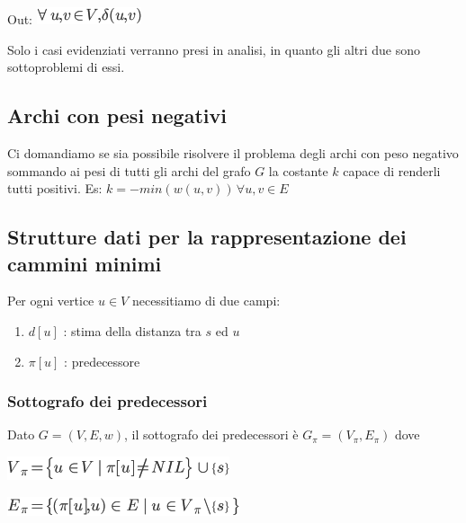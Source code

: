 \documentclass{article}
\providecommand{\tightlist}{%
  \setlength{\itemsep}{0pt}\setlength{\parskip}{0pt}}
\begin{document}
{{{{Out: }\includegraphics{images/image506.png}

{}

{Solo i casi evidenziati verranno presi in analisi, in quanto gli altri
due sono sottoproblemi di essi.}

{}

\subsection{\texorpdfstring{{Archi con pesi negativi}}{Archi con pesi negativi}}\label{h.tf12b72w5l3}

{Ci domandiamo se sia possibile risolvere il problema degli archi con peso negativo sommando ai pesi di tutti gli archi del grafo $G$ la costante $k$ capace di renderli tutti positivi. Es: $k=-min(w(u,v))\,\forall u,v \in E$}

\subsection{\texorpdfstring{{Strutture dati per la rappresentazione dei cammini minimi}}{Strutture dati per la rappresentazione dei cammini minimi}}\label{h.ee7q1txmgnne}

{}

{Per ogni vertice $u \in V$ necessitiamo di due campi:}

\begin{enumerate}
\tightlist
\item
$d[u]$ : stima della distanza tra $s$ ed $u$
\item
$\pi[u]$ : predecessore
\end{enumerate}

\subsubsection{\texorpdfstring{{Sottografo dei predecessori}}{Sottografo dei predecessori}}\label{h.ky1vo2u762au}

{Dato $G=(V,E,w)$, il sottografo dei predecessori è $G_\pi=(V_\pi,E_\pi)$ dove}

\includegraphics{images/image512.png}{~}

\includegraphics{images/image513.png}{~}

}}}
\end{document}
